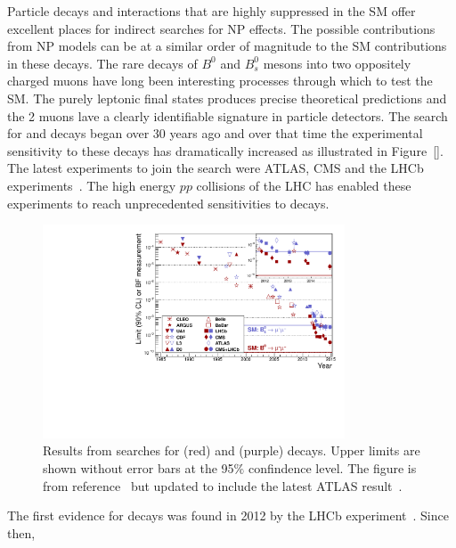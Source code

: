 Particle decays and interactions that are highly suppressed in the SM offer excellent places for indirect searches for NP effects. The possible contributions from NP models can be at a similar order of magnitude to the SM contributions in these decays. The rare decays of $B^{0}$ and $B^{0}_{s}$ mesons into two oppositely charged muons have long been interesting processes through which to test the SM. The purely leptonic final states produces precise theoretical predictions and the 2 muons lave a clearly identifiable signature in particle detectors. The search for \bdmumu and \bsmumu decays began over 30 years ago and over that time the experimental sensitivity to these decays has dramatically increased as illustrated in Figure~\ref{}. The latest experiments to join the search were ATLAS, CMS and the LHCb experiments~\cite{Aad:2012pn,Aaboud:2016ire, Chatrchyan:2011kr, Chatrchyan:2012rga, Chatrchyan:2013bka, Aaij:2011rja, LHCb:2011ac,Aaij:2012ac,Aaij:2012nna,Aaij:2013aka,CMS:2014xfa}. The high energy $pp$ collisions of the LHC has enabled these experiments to reach unprecedented sensitivities to \bmumu decays. 
\begin{figure}[tbp]
    \centering
        \includegraphics[width=0.8\textwidth]{./Figs/Introduction/CMSLHCb_EDfig7.pdf}
    \caption{Results from searches for \bdmumu (red) and \bsmumu (purple) decays. Upper limits are shown without error bars at the 95$\%$ confindence level. The figure is from reference~\cite{CMS:2014xfa} but updated to include the latest ATLAS result~\cite{Aaboud:2016ire}.}
    \label{fig:bmumu_history}
\end{figure}
The first evidence for \bsmumu decays was found in 2012 by the LHCb experiment~\cite{Aaij:2012nna}. Since then,
